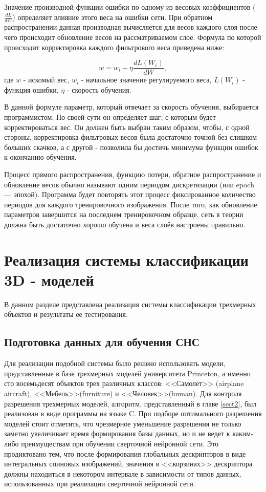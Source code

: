 \documentclass[14pt]{article}
\numberwithin{figure}{section}
\numberwithin{equation}{section}
\begin{document}
Значение производной функции ошибки по одному из весовых коэффициентов ($\frac{dL}{dW}$) определяет влияние этого веса на ошибки сети. При обратном распространении данная производная вычисляется для весов каждого слоя после чего происходит обновление весов на рассматриваемом слое. Формула по которой происходит корректировка каждого фильтрового веса приведена ниже:

\begin{equation}
    w = w_i - \eta\frac{dL(W_i)}{dW},
\end{equation}
где $w$ - искомый вес, $w_i$ - начальное значение регулируемого веса, $L(W_i)$ - функция ошибки, $\eta$ - скорость обучения.

В данной формуле параметр, который отвечает за скорость обучения, выбирается программистом. По своей сути он определяет шаг, с которым будет корректироваться вес. Он должен быть выбран таким образом, чтобы, с одной стороны, корректировка фильтровых весов была достаточно точной без слишком больших скачков, а с другой - позволила бы достичь минимума функции ошибок к окончанию обучения.

Процесс прямого распространения, функцию потери, обратное распространение и обновление весов обычно называют одним периодом дискретизации (или epoch — эпохой). Программа будет повторять этот процесс фиксированное количество периодов для каждого тренировочного изображения. После того, как обновление параметров завершится на последнем тренировочном образце, сеть в теории должна быть достаточно хорошо обучена и веса слоёв настроены правильно.

\newpage

\section{Реализация системы классификации 3D - моделей}

В данном разделе представлена реализация системы классификации трехмерных объектов и результаты ее тестирования.

\subsection{Подготовка данных для обучения СНС}

Для реализации подобной системы было решено использовать модели, представленные в базе трехмерных моделей университета Princeton, а именно сто восемьдесят объектов трех различных классов: <<Самолет>> (airplane aircraft), <<Мебель>>(furniture) и <<Человек>>(human). Для контроля разрешения трехмерных моделей, алгоритм, представленный в главе \ref{sect2}, был реализован в виде программы на языке C. При подборе оптимального разрешения моделей стоит отметить, что чрезмерное уменьшение разрешения не только заметно увеличивает время формирования базы данных, но и не ведет к каким-либо преимуществам при обучении сверточной нейронной сети. Это продиктовано тем, что после формирования глобальных дескрипторов в виде интегральных спиновых изображений, значения в <<корзинах>> дескриптора должны находиться в некотором интервале в зависимости от типов данных, использованных при реализации сверточной нейронной сети.
\end{document}
